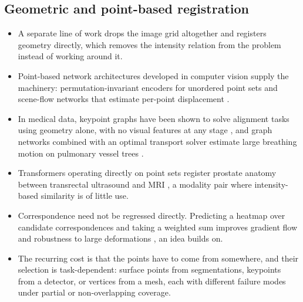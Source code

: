 \subsection{Geometric and point-based registration}
\begin{itemize}
\item A separate line of work drops the image grid altogether and registers geometry directly, which removes the intensity relation from the problem instead of working around it.
\item Point-based network architectures developed in computer vision supply the machinery: permutation-invariant encoders for unordered point sets \citep{qi2017pointnet} and scene-flow networks that estimate per-point displacement \citep{wu2020pointpwc}.
\item In medical data, keypoint graphs have been shown to solve alignment tasks using geometry alone, with no visual features at any stage \citep{hansen2021deep}, and graph networks combined with an optimal transport solver estimate large breathing motion on pulmonary vessel trees \citep{shen2021accurate}.
\item Transformers operating directly on point sets register prostate anatomy between transrectal ultrasound and MRI \citep{baum2021real}, a modality pair where intensity-based similarity is of little use.
\item Correspondence need not be regressed directly. Predicting a heatmap over candidate correspondences and taking a weighted sum improves gradient flow and robustness to large deformations \citep{heinrich2022voxelmorphplusplus}, an idea  builds on.
\item The recurring cost is that the points have to come from somewhere, and their selection is task-dependent: surface points from segmentations, keypoints from a detector, or vertices from a mesh, each with different failure modes under partial or non-overlapping coverage.
\end{itemize}

